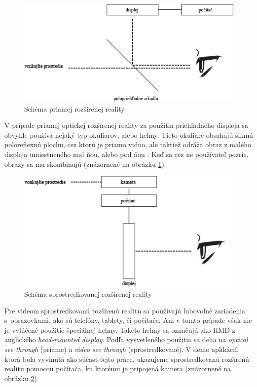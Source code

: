 \begin{figure}[h]
 \centering
 \includegraphics[scale=0.6]{pictures/schema-hmd}
 \caption{Schéma priamej rozšírenej reality}
 \label{prama-realita}
 \end{figure}

V prípade priamej optickej rozšírenej reality za použitia priehľadného displeja sa obvykle používa nejaký typ okuliarov, alebo helmy. Tieto okuliare obsahujú šikmú poloreflexnú plochu, cez ktorú je priamo vidno, ale taktiež odráža obraz z malého displeja umiestneného nad ňou, alebo pod ňou \cite{Bimber05}. Keď sa cez ne používateľ pozrie, obrazy sa mu skombinujú (znázornené na obrázku \ref{prama-realita}).

\begin{figure}[h]
 \centering
 \includegraphics[scale=0.6]{pictures/schema-hmd-2}
 \caption{Schéma sprostredkovanej rozšírenej reality}
 \label{nepriama-realita}
 \end{figure}

Pre videom sprostredkovanú rozšírenú realitu sa používajú ľubovoľné zariadenia s~obrazovkami, ako sú telefóny, tablety, či počítače. Ani v tomto prípade však nie je vylúčené použitie špeciálnej helmy. Takéto helmy sa označujú ako HMD z anglického \emph{head-mounted display}. Podľa vysvetleného použitia sa delia na \emph{optical see through} (priame) a \emph{video see through} (sprostredkované). V demo aplikácií, ktorá bola vyvinutá ako súčasť tejto práce, ukazujeme sprostredkovanú rozšírenú realitu pomocou počítača, ku ktorému je pripojená kamera (znázornené na obrázku \ref{nepriama-realita}).

